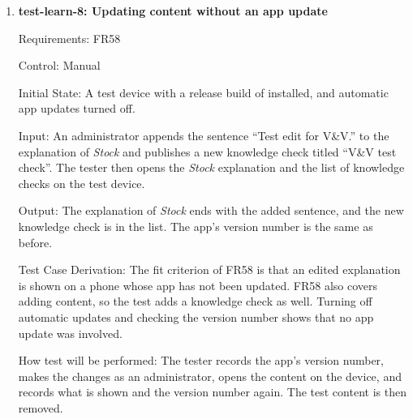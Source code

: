 \documentclass[12pt, titlepage]{article}
\begin{document}
\begin{enumerate}
Input: The user opens the explanation of \textit{Diversification}, completes
the knowledge check on \textit{Diversification} with 7 answers correct, and
completes the knowledge check on \textit{Stock} with 6 answers correct.

Output: The user's learning progress shows the \textit{Diversification}
explanation as viewed and its knowledge check as passed. It does not show the
\textit{Stock} knowledge check as passed.

Test Case Derivation: The fit criterion of FR57 is that a viewed explanation
and a passed knowledge check both appear in the user's progress. A check is
passed when at least \texttt{KNOWLEDGE\_CHECK\_\allowbreak PASS\_MARK} (70\%) of
its answers are correct (SRS Appendix C), so 7 of 10 is exactly at the mark and
6 of 10 is just below it. Each check has 10 questions so that one can sit
exactly at 70\%. The failed check shows that progress records only passed
checks.

How test will be performed: A pytest test sends each action through the API
and reads the user's learning progress.

\item{\textbf{test-learn-8: Updating content without an app update}\\}

Requirements: FR58

Control: Manual

Initial State: A test device with a release build of \progname{} installed,
and automatic app updates turned off.

Input: An administrator appends the sentence ``Test edit for V\&V.'' to the
explanation of \textit{Stock} and publishes a new knowledge check titled
``V\&V test check''. The tester then opens the \textit{Stock} explanation and
the list of knowledge checks on the test device.

Output: The explanation of \textit{Stock} ends with the added sentence, and
the new knowledge check is in the list. The app's version number is the same
as before.

Test Case Derivation: The fit criterion of FR58 is that an edited explanation
is shown on a phone whose app has not been updated. FR58 also covers adding
content, so the test adds a knowledge check as well. Turning off automatic
updates and checking the version number shows that no app update was
involved.

How test will be performed: The tester records the app's version number,
makes the changes as an administrator, opens the content on the device, and
records what is shown and the version number again. The test content is then
removed.


\end{enumerate}
\end{document}
